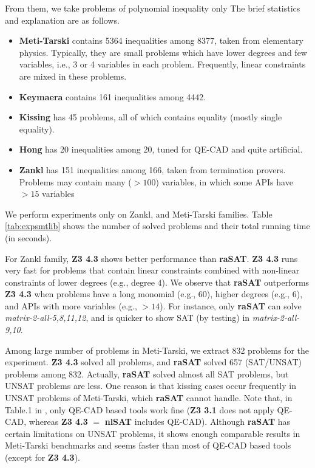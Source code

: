 \documentclass[runningheads,a4paper,oribibl]{llncs}
\begin{document}
From them, we take problems of polynomial inequality only %
The brief statistics and explanation are as follows. 
\begin{itemize}
\item {\bf Meti-Tarski} contains 5364 inequalities among 8377, taken from elementary physics.
Typically, they are small problems which have lower degrees and few variables, 
i.e., 3 or 4 variables in each problem. 
Frequently, linear constraints are mixed in these problems.
\item {\bf Keymaera} contains 161 inequalities among 4442. 
\item {\bf Kissing} has 45 problems, all of which contains equality (mostly single equality). 
\item {\bf Hong} has 20 inequalities among 20, tuned for QE-CAD and quite artificial. 
\item {\bf Zankl} has 151 inequalities among 166, taken from termination provers. 
Problems may contain many ($>100$) variables, in which some APIs have $>15$ variables
\end{itemize}


We perform experiments only on Zankl, and Meti-Tarski families. 
Table \ref{tab:expsmtlib} shows the number of solved problems and 
their total running time (in seconds). 

For Zankl family,  {\bf Z3 4.3} shows better performance than {\bf raSAT}. 
 {\bf Z3 4.3} runs very fast for problems that contain linear constraints combined with 
non-linear constraints of lower degrees (e.g., degree $4$). 
We observe that {\bf raSAT} outperforms {\bf Z3 4.3} when problems have 
a long monomial (e.g., 60), higher degrees (e.g., 6), and APIs with more variables 
(e.g., $>14$). 
For instance, only {\bf raSAT} can solve \emph{matrix-2-all-5,8,11,12}, and 
is quicker to show SAT (by testing) in \emph{matrix-2-all-9,10}. 

Among large number of problems in Meti-Tarski, 
we extract 832 problems for the experiment. 
\textbf{Z3 4.3} solved all problems, and 
\textbf{raSAT} solved 657 (SAT/UNSAT) problems among 832. 
Actually, \textbf{raSAT} solved almost all SAT problems, 
but UNSAT problems are less. 
One reason is that kissing cases occur frequently in UNSAT problems of Meti-Tarski, 
which \textbf{raSAT} cannot handle. 
Note that, in Table.1 in \cite{Jovanovic13}, only QE-CAD based tools work fine 
(\textbf{Z3 3.1} does not apply QE-CAD, whereas \textbf{Z3 4.3} $=$ \textbf{nlSAT}
includes QE-CAD). 
Although \textbf{raSAT} has certain limitations on UNSAT problems, 
it shows enough comparable results in Meti-Tarski benchmarks 
and seems faster than most of QE-CAD based tools (except for \textbf{Z3 4.3}). 
\end{document}
